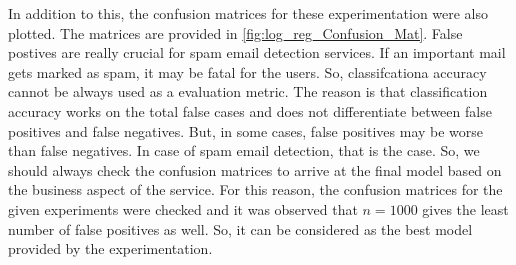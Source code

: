 \documentclass[11pt]{article}
\begin{document}
In addition to this, the confusion matrices for these experimentation were also plotted. The matrices are provided in \autoref{fig:log_reg_Confusion_Mat}. False postives are really crucial for spam email detection services. If an important mail gets marked as spam, it may be fatal for the users. So, classifcationa accuracy cannot be always used as a evaluation metric. The reason is that classification accuracy works on the total false cases and does not differentiate between false positives and false negatives. But, in some cases, false positives may be worse than false negatives. In case of spam email detection, that is the case. So, we should always check the confusion matrices to arrive at the final model based on the business aspect of the service. For this reason, the confusion matrices for the given experiments were checked and it was observed that $n=1000$ gives the least number of false positives as well. So, it can be considered as the best model provided by the experimentation.
\end{document}
